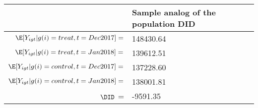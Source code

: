 \begin{tabular}{rl}
\toprule
 & Sample analog of the population DID \\
\midrule
$\E[Y_{igt}|g(i) = treat, t=Dec2017] = $ & 148430.64 \\
$\E[Y_{igt}|g(i) = treat, t=Jan2018] = $ & 139612.51 \\
$\E[Y_{igt}|g(i) = control, t=Dec2017] = $ & 137228.60 \\
$\E[Y_{igt}|g(i) = control, t=Jan2018] = $ & 138001.81 \\
$\DID$ =  & -9591.35 \\
\bottomrule
\end{tabular}
